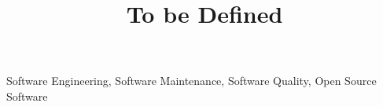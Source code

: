 \documentclass[10pt,conference]{IEEEtran}
\begin{document}
\title{To be Defined}

\author{
}


\maketitle

\begin{abstract}

\end{abstract}

\begin{IEEEkeywords}
Software Engineering, Software Maintenance, Software Quality, Open Source Software
\end{IEEEkeywords}








\medskip
%
%

\vspace{12pt}
\color{red}
\end{document}
